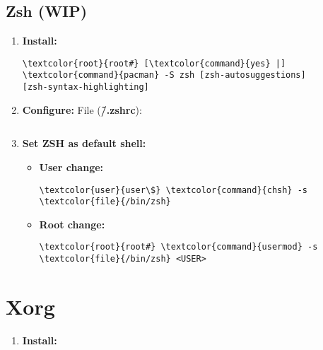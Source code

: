 \documentclass[10pt, a4paper, onecolumn, openany]{book} %
\begin{document}
\section{Zsh (WIP)}
\begin{enumerate}
    \item \textbf{Install:}
\begin{Verbatim}[commandchars=\\\{\}]
\textcolor{root}{root#} [\textcolor{command}{yes} |] \textcolor{command}{pacman} -S zsh [zsh-autosuggestions] 
[zsh-syntax-highlighting]
\end{Verbatim}    
    \item \textbf{Configure:}
\newline File (\textbf{\textcolor{file}{\~/.zshrc}}):
\begin{Verbatim}[commandchars=\\\{\}]

\end{Verbatim}
    \item \textbf{Set ZSH as default shell:}
    \begin{itemize}
        \item \textbf{User change:}
\begin{Verbatim}[commandchars=\\\{\}]
\textcolor{user}{user\$} \textcolor{command}{chsh} -s \textcolor{file}{/bin/zsh}
\end{Verbatim}
        \item \textbf{Root change:}
\begin{Verbatim}[commandchars=\\\{\}]
\textcolor{root}{root#} \textcolor{command}{usermod} -s \textcolor{file}{/bin/zsh} <USER>
\end{Verbatim}
    \end{itemize}
\end{enumerate}



\chapter{Xorg}
\begin{enumerate}
    \item \textbf{Install:}

\end{enumerate}
\end{document}
